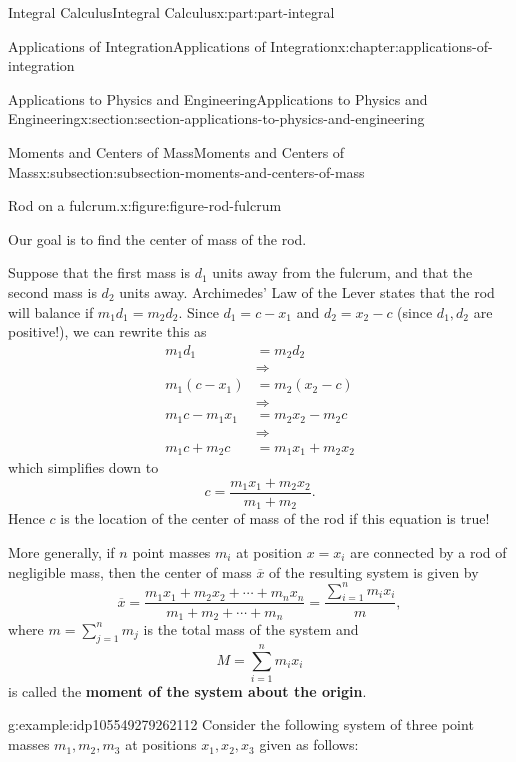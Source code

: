 \documentclass[twoside,10pt,]{book}
\newcommand{\terminology}[1]{\textbf{#1}}
\numberwithin{equation}{part}
\newcommand{\amp}{&}
\begin{document}
\begin{partptx}{Integral Calculus}{}{Integral Calculus}{}{}{x:part:part-integral}
\begin{chapterptx}{Applications of Integration}{}{Applications of Integration}{}{}{x:chapter:applications-of-integration}
\begin{sectionptx}{Applications to Physics and Engineering}{}{Applications to Physics and Engineering}{}{}{x:section:section-applications-to-physics-and-engineering}
\begin{subsectionptx}{Moments and Centers of Mass}{}{Moments and Centers of Mass}{}{}{x:subsection:subsection-moments-and-centers-of-mass}
\begin{figureptx}{Rod on a fulcrum.}{x:figure:figure-rod-fulcrum}{}
\begin{image}{0}{1}{0}
{
}%
\end{image}%
\tcblower
\end{figureptx}%
Our goal is to find the center of mass of the rod.%
\par
Suppose that the first mass is \(d_{1}\) units away from the fulcrum, and that the second mass is \(d_{2}\) units away. Archimedes' Law of the Lever states that the rod will balance if \(m_{1}d_{1} = m_{2}d_{2}\). Since \(d_{1} = c - x_{1}\) and \(d_{2} = x_{2} - c\) (since \(d_{1},d_{2}\) are positive!), we can rewrite this as%
\begin{align*}
m_{1}d_{1} \amp= m_{2}d_{2}\\
\amp\Rightarrow\\
m_{1}(c-x_{1}) \amp= m_{2}(x_{2}-c)\\
\amp\Rightarrow\\
m_{1}c-m_{1}x_{1} \amp= m_{2}x_{2} - m_{2}c\\
\amp\Rightarrow\\
m_{1}c+m_{2}c \amp= m_{1}x_{1}+m_{2}x_{2}
\end{align*}
which simplifies down to%
\begin{equation*}
c = \frac{m_{1}x_{1}+m_{2}x_{2}}{m_{1}+m_{2}}.
\end{equation*}
Hence \(c\) is the location of the center of mass of the rod if this equation is true!%
\par
More generally, if \(n\) point masses \(m_{i}\) at position \(x=x_{i}\) are connected by a rod of negligible mass, then the center of mass \(\overline{x}\) of the resulting system is given by%
\begin{equation*}
\overline{x} = \frac{m_{1}x_{1}+m_{2}x_{2}+\cdots+m_{n}x_{n}}{m_{1}+m_{2}+\cdots+m_{n}} = \frac{\sum_{i=1}^{n}m_{i}x_{i}}{m},
\end{equation*}
where \(m = \sum_{j=1}^{n}m_{j}\) is the total mass of the system and%
\begin{equation*}
M = \sum_{i=1}^{n}m_{i}x_{i}
\end{equation*}
is called the \terminology{moment of the system about the origin}.%
\begin{example}{}{g:example:idp105549279262112}%
Consider the following system of three point masses \(m_{1},m_{2},m_{3}\) at positions \(x_{1},x_{2},x_{3}\) given as follows:%

\end{example}
\end{subsectionptx}
\end{sectionptx}
\end{chapterptx}
\end{partptx}
\end{document}
